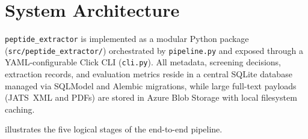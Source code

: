 \section{System Architecture}
\label{sec:architecture}

\texttt{peptide\_extractor} is implemented as a modular Python package (\texttt{src/peptide\_extractor/}) orchestrated by \texttt{pipeline.py} and exposed through a YAML-configurable Click CLI (\texttt{cli.py}). All metadata, screening decisions, extraction records, and evaluation metrics reside in a central SQLite database managed via SQLModel and Alembic migrations, while large full-text payloads (JATS~XML and PDFs) are stored in Azure Blob Storage with local filesystem caching.

 illustrates the five logical stages of the end-to-end pipeline.

